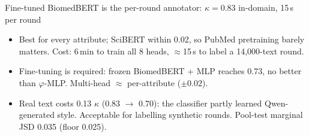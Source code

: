 \documentclass[11pt,aspectratio=169]{beamer}
\begin{document}
\begin{frame}{Fine-tuned BiomedBERT is the per-round annotator: $\kappa = 0.83$ in-domain, 15\,s per round}
\centering\footnotesize
{}

\raggedright
\smallskip\small
\begin{itemize}
  \item Best for every attribute; SciBERT within 0.02, so PubMed pretraining barely matters. Cost: 6\,min to train all 8 heads, $\approx$15\,s to label a 14{,}000-text round.
  \item \alert{Fine-tuning is required}: frozen BiomedBERT + MLP reaches 0.73, no better than $\varphi$-MLP. Multi-head $\approx$ per-attribute ($\pm 0.02$).
  \item Real text costs 0.13 $\kappa$ (0.83 $\to$ 0.70): the classifier partly learned Qwen-generated style. Acceptable for labelling synthetic rounds. Pool-test marginal JSD 0.035 (floor 0.025).
\end{itemize}
\end{frame}
\end{document}
